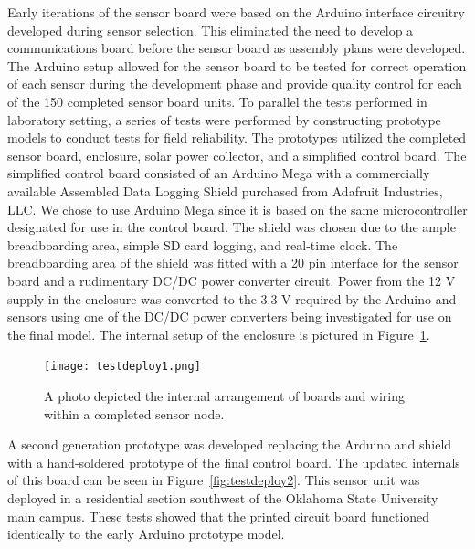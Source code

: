 \documentclass[journal]{IEEEtran}
\begin{document}
Early iterations of the sensor board were based on the Arduino interface circuitry developed during sensor selection.  This eliminated the need to develop a communications board before the sensor board as assembly plans were developed.  The Arduino setup allowed for the sensor board to be tested for correct operation of each sensor during the development phase and provide quality control for each of the 150 completed sensor board units.  To parallel the tests performed in laboratory setting, a series of tests were performed by constructing prototype models to conduct tests for field reliability.  The prototypes utilized the completed sensor board, enclosure, solar power collector, and a simplified control board.  The simplified control board consisted of an Arduino Mega with a commercially available Assembled Data Logging Shield purchased from Adafruit Industries, LLC.  We chose to use Arduino Mega since it is based on the same microcontroller designated for use in the control board.  The shield was chosen due to the ample breadboarding area, simple SD card logging, and real-time clock.  The breadboarding area of the shield was fitted with a 20 pin interface for the sensor board and a rudimentary DC/DC power converter circuit.  Power from the 12 V supply in the enclosure was converted to the 3.3 V required by the Arduino and sensors using one of the DC/DC power converters being investigated for use on the final model.  The internal setup of the enclosure is pictured in Figure~\ref{fig:TLFig3_e}.  

\begin{figure}[!t]
	\centering
	\texttt{[image: testdeploy1.png]}
	\caption[Completed Sensor Node]{A photo depicted the internal arrangement of boards and wiring within a completed sensor node.\label{fig:TLFig3_e}}
\end{figure}

A second generation prototype was developed replacing the Arduino and shield with a hand-soldered prototype of the final control board.  The updated internals of this board can be seen in Figure~\ref{fig:testdeploy2}.  This sensor unit was deployed in a residential section southwest of the Oklahoma State University main campus.  These tests showed that the printed circuit board functioned identically to the early Arduino prototype model.
\end{document}

